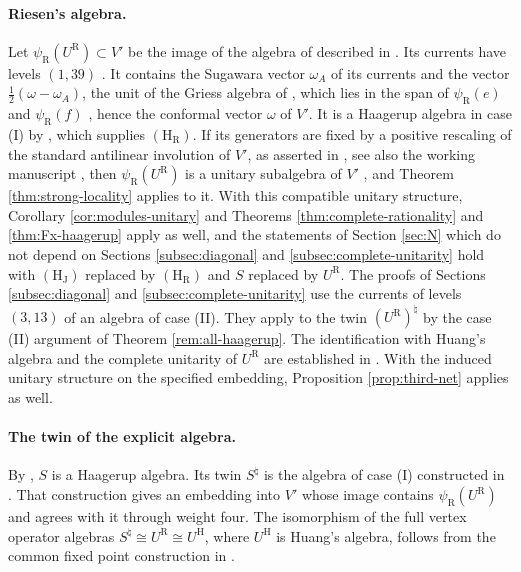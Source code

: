 \documentclass[leqno]{article}
\numberwithin{equation}{section}
\begin{document}
\paragraph{Riesen's algebra.} Let $\psi_{\mathrm R}(U^{\mathrm R}) \subset V'$ be the image of the algebra of \cite{Rie26} described in \cite[Proposition 10.36]{Arh26}. Its currents have levels $(1,39)$ \cite[Proposition 10.36]{Arh26}. It contains the Sugawara vector $\omega_A$ of its currents and the vector $\frac12(\omega-\omega_A)$, the unit of the Griess algebra of \cite[Lemma 10.1]{Arh26}, which lies in the span of $\psi_{\mathrm R}(e)$ and $\psi_{\mathrm R}(f)$ \cite[Proposition 10.3 and Proposition 10.36]{Arh26}, hence the conformal vector $\omega$ of $V'$. It is a Haagerup algebra in case (I) by \cite[Theorem 7.13(1)]{ArhIII}, which supplies $\mathrm{(H_R)}$. If its generators are fixed by a positive rescaling of the standard antilinear involution of $V'$, as asserted in \cite[Theorem 1 p.~1 and p.~4]{Rie26}, see also the working manuscript \cite[Sections 2--3 pp.~16--19]{Rie26b}, then $\psi_{\mathrm R}(U^{\mathrm R})$ is a unitary subalgebra of $V'$ \cite[Proposition 5.23 p.~43]{CKLW18}, and Theorem \ref{thm:strong-locality} applies to it. With this compatible unitary structure, Corollary \ref{cor:modules-unitary} and Theorems \ref{thm:complete-rationality} and \ref{thm:Fx-haagerup} apply as well, and the statements of Section \ref{sec:N} which do not depend on Sections \ref{subsec:diagonal} and \ref{subsec:complete-unitarity} hold with $\mathrm{(H_J)}$ replaced by $\mathrm{(H_R)}$ and $S$ replaced by $U^{\mathrm R}$. The proofs of Sections \ref{subsec:diagonal} and \ref{subsec:complete-unitarity} use the currents of levels $(3,13)$ of an algebra of case (II). They apply to the twin $(U^{\mathrm R})^\natural$ by the case (II) argument of Theorem \ref{rem:all-haagerup}. The identification with Huang's algebra and the complete unitarity of $U^{\mathrm R}$ are established in \cite[Theorem 7.13(1)--(2)]{ArhIII}. With the induced unitary structure on the specified embedding, Proposition \ref{prop:third-net} applies as well.

\paragraph{The twin of the explicit algebra.} By \cite[Theorem 6.1]{ArhIII}, $S$ is a Haagerup algebra. Its twin $S^\natural$ is the algebra of case (I) constructed in \cite[Theorems 12.3 and 12.4(1)]{Arh26}. That construction gives an embedding into $V'$ whose image contains $\psi_{\mathrm R}(U^{\mathrm R})$ and agrees with it through weight four. The isomorphism of the full vertex operator algebras $S^\natural \cong U^{\mathrm R} \cong U^{\mathrm H}$, where $U^{\mathrm H}$ is Huang's algebra, follows from the common fixed point construction in \cite[Theorem 7.9 and Theorem 7.13(1)]{ArhIII}.
\end{document}
